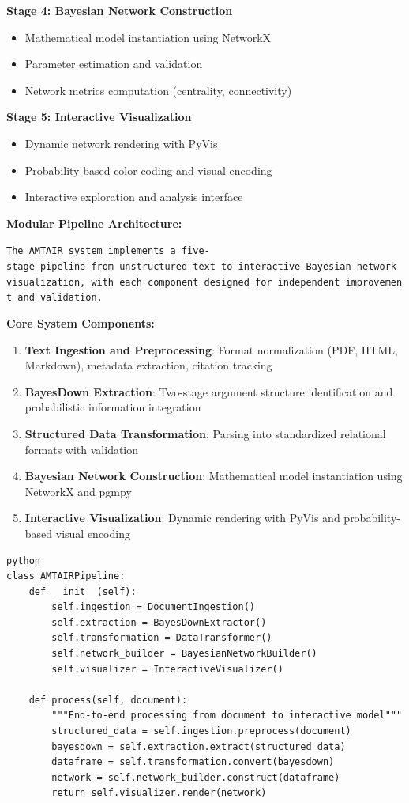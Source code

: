 \documentclass[
  11pt,
  letterpaper,
]{book}
\providecommand{\tightlist}{%
  \setlength{\itemsep}{0pt}\setlength{\parskip}{0pt}}
\begin{document}
\textbf{Stage 4: Bayesian Network Construction}

\begin{itemize}
\tightlist
\item
  Mathematical model instantiation using NetworkX
\item
  Parameter estimation and validation
\item
  Network metrics computation (centrality, connectivity)
\end{itemize}

\textbf{Stage 5: Interactive Visualization}

\begin{itemize}
\tightlist
\item
  Dynamic network rendering with PyVis
\item
  Probability-based color coding and visual encoding
\item
  Interactive exploration and analysis interface
\end{itemize}

\textbf{Modular Pipeline Architecture:}

\texttt{The\ AMTAIR\ system\ implements\ a\ five-stage\ pipeline\ from\ unstructured\ text\ to\ interactive\ Bayesian\ network\ visualization,\ with\ each\ component\ designed\ for\ independent\ improvement\ and\ validation.}

\textbf{Core System Components:}

\begin{enumerate}
\def\labelenumi{\arabic{enumi}.}
\tightlist
\item
  \textbf{Text Ingestion and Preprocessing}: Format normalization (PDF,
  HTML, Markdown), metadata extraction, citation tracking
\item
  \textbf{BayesDown Extraction}: Two-stage argument structure
  identification and probabilistic information integration
\item
  \textbf{Structured Data Transformation}: Parsing into standardized
  relational formats with validation
\item
  \textbf{Bayesian Network Construction}: Mathematical model
  instantiation using NetworkX and pgmpy
\item
  \textbf{Interactive Visualization}: Dynamic rendering with PyVis and
  probability-based visual encoding
\end{enumerate}

\begin{verbatim}
python
class AMTAIRPipeline:
    def __init__(self):
        self.ingestion = DocumentIngestion()
        self.extraction = BayesDownExtractor() 
        self.transformation = DataTransformer()
        self.network_builder = BayesianNetworkBuilder()
        self.visualizer = InteractiveVisualizer()
    
    def process(self, document):
        """End-to-end processing from document to interactive model"""
        structured_data = self.ingestion.preprocess(document)
        bayesdown = self.extraction.extract(structured_data)
        dataframe = self.transformation.convert(bayesdown)
        network = self.network_builder.construct(dataframe)
        return self.visualizer.render(network)
\end{verbatim}
\end{document}
